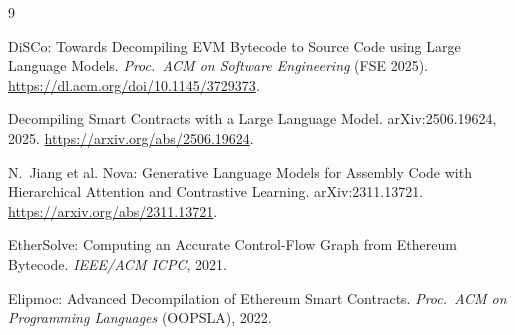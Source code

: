 \documentclass[10pt,conference]{article}
\begin{document}
\begin{thebibliography}{9}

DiSCo: Towards Decompiling EVM Bytecode to Source Code using Large Language
Models. \emph{Proc.\ ACM on Software Engineering} (FSE 2025).
\url{https://dl.acm.org/doi/10.1145/3729373}.

Decompiling Smart Contracts with a Large Language Model. arXiv:2506.19624, 2025.
\url{https://arxiv.org/abs/2506.19624}.

N.\ Jiang et al. Nova: Generative Language Models for Assembly Code with
Hierarchical Attention and Contrastive Learning. arXiv:2311.13721.
\url{https://arxiv.org/abs/2311.13721}.

EtherSolve: Computing an Accurate Control-Flow Graph from Ethereum Bytecode.
\emph{IEEE/ACM ICPC}, 2021.

Elipmoc: Advanced Decompilation of Ethereum Smart Contracts.
\emph{Proc.\ ACM on Programming Languages} (OOPSLA), 2022.

\end{thebibliography}
\end{document}
